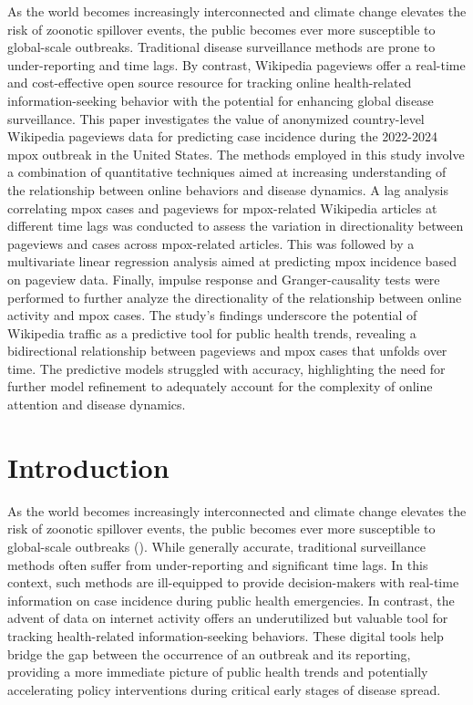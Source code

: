 \documentclass[
  12pt,
]{article}
\begin{document}
As the world becomes increasingly interconnected and climate change
elevates the risk of zoonotic spillover events, the public becomes ever
more susceptible to global-scale outbreaks. Traditional disease
surveillance methods are prone to under-reporting and time lags. By
contrast, Wikipedia pageviews offer a real-time and cost-effective open
source resource for tracking online health-related information-seeking
behavior with the potential for enhancing global disease surveillance.
This paper investigates the value of anonymized country-level Wikipedia
pageviews data for predicting case incidence during the 2022-2024 mpox
outbreak in the United States. The methods employed in this study
involve a combination of quantitative techniques aimed at increasing
understanding of the relationship between online behaviors and disease
dynamics. A lag analysis correlating mpox cases and pageviews for
mpox-related Wikipedia articles at different time lags was conducted to
assess the variation in directionality between pageviews and cases
across mpox-related articles. This was followed by a multivariate linear
regression analysis aimed at predicting mpox incidence based on pageview
data. Finally, impulse response and Granger-causality tests were
performed to further analyze the directionality of the relationship
between online activity and mpox cases. The study's findings underscore
the potential of Wikipedia traffic as a predictive tool for public
health trends, revealing a bidirectional relationship between pageviews
and mpox cases that unfolds over time. The predictive models struggled
with accuracy, highlighting the need for further model refinement to
adequately account for the complexity of online attention and disease
dynamics.

\section{Introduction}\label{introduction}

As the world becomes increasingly interconnected and climate change
elevates the risk of zoonotic spillover events, the public becomes ever
more susceptible to global-scale outbreaks
(). While generally
accurate, traditional surveillance methods often suffer from
under-reporting and significant time lags. In this context, such methods
are ill-equipped to provide decision-makers with real-time information
on case incidence during public health emergencies. In contrast, the
advent of data on internet activity offers an underutilized but valuable
tool for tracking health-related information-seeking behaviors. These
digital tools help bridge the gap between the occurrence of an outbreak
and its reporting, providing a more immediate picture of public health
trends and potentially accelerating policy interventions during critical
early stages of disease spread.
\end{document}
